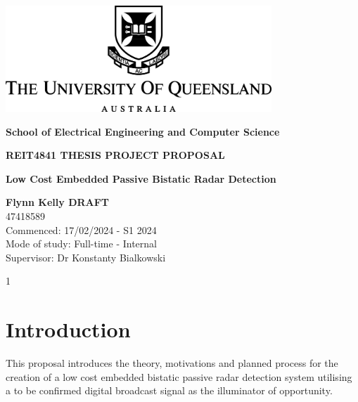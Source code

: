 \documentclass[12pt,a4paper]{article}
\begin{document}
\begin{titlepage}
    \begin{center}
        \vspace*{1cm}

        \includegraphics[width=0.75\textwidth]{UQLogo.jpg}
        
        \vspace{1.5cm}
        
        \textbf{\Large{School of Electrical Engineering and Computer Science}}
        
        \vspace{2.5cm}
        
        \textbf{\Large{REIT4841 THESIS  PROJECT PROPOSAL}}
        
        \vspace{0.5cm}

        \textbf{\Large{Low Cost Embedded Passive Bistatic Radar Detection}}
        
        \vspace{2cm}
        
        \textbf{Flynn Kelly DRAFT}\\
        47418589\\
        
        Commenced: 17/02/2024 - S1 2024\\
        Mode of study: Full-time - Internal\\
        Supervisor: Dr Konstanty Bialkowski
        
        \vfill
        
        \vspace{0.8cm}
        
        \Large{1}
        
    \end{center}
\end{titlepage}

\tableofcontents
\clearpage


\section{Introduction}
This proposal introduces the theory, motivations and planned process for the creation of a low cost embedded bistatic passive radar detection system utilising a to be confirmed digital broadcast signal as the illuminator of opportunity. 
\end{document}
